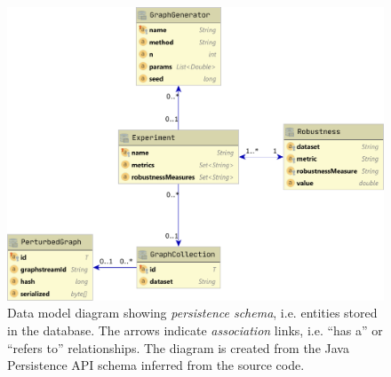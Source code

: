 \begin{figure}
\includegraphics[width=0.8\linewidth]{data_model_diagram.pdf}
\caption{Data model diagram showing \textsl{persistence schema}, i.e. entities stored in the database.
The arrows indicate \textsl{association} links, i.e. ``has a'' or ``refers to'' relationships.
The diagram is created from the Java Persistence API schema inferred from the source code.}
\label{fig:data_model_diagram}
\end{figure}
